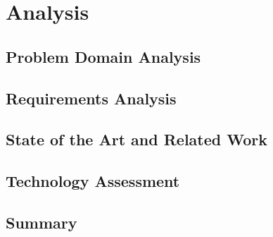 \chapter{Analysis}
\label{ch:analysis}

\section{Problem Domain Analysis}
\label{sec:problem-domain}


\section{Requirements Analysis}
\label{sec:requirements}


\section{State of the Art and Related Work}
\label{sec:state-of-art}


\section{Technology Assessment}
\label{sec:technology-assessment}


\section{Summary}
\label{sec:analysis-summary}

